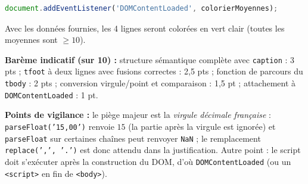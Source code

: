 \documentclass[11pt]{article}
\begin{document}
\begin{corrige}
\begin{lstlisting}[language=JavaScript]
document.addEventListener('DOMContentLoaded', colorierMoyennes);
\end{lstlisting}
Avec les données fournies, les 4 lignes seront colorées en vert clair (toutes les moyennes sont $\ge 10$).

\textbf{Barème indicatif (sur 10) :} structure sémantique complète avec \texttt{caption} : 3 pts ; \texttt{tfoot} à deux lignes avec fusions correctes : 2,5 pts ; fonction de parcours du \texttt{tbody} : 2 pts ; conversion virgule/point et comparaison : 1,5 pt ; attachement à \texttt{DOMContentLoaded} : 1 pt.

\textbf{Points de vigilance :} le piège majeur est la \emph{virgule décimale française} : \texttt{parseFloat('15,00')} renvoie $15$ (la partie après la virgule est ignorée) et \texttt{parseFloat} sur certaines chaînes peut renvoyer \texttt{NaN} ; le remplacement \texttt{replace(',', '.')} est donc attendu dans la justification. Autre point : le script doit s'exécuter après la construction du DOM, d'où \texttt{DOMContentLoaded} (ou un \texttt{<script>} en fin de \texttt{<body>}).
\end{corrige}
\end{document}
